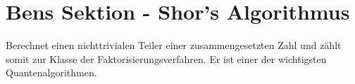 \section{Bens Sektion -  Shor's Algorithmus}
Berechnet einen nichttrivialen Teiler einer zusammengesetzten Zahl und 
zählt somit zur Klasse der Faktorisierungsverfahren. Er ist einer der wichtigsten Quantenalgorithmen.\\

 